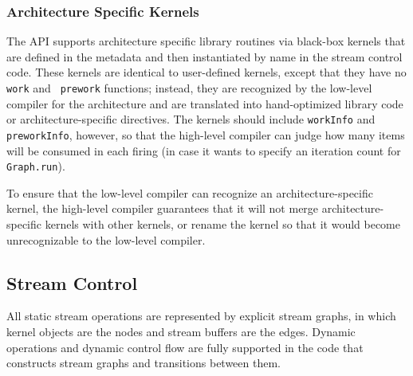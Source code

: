 \subsubsection{Architecture Specific Kernels}
\label{sec:kernelllc}


The API supports architecture specific library routines via black-box
kernels that are defined in the metadata and then instantiated by name
in the stream control code.  These kernels are identical to
user-defined kernels, except that they have no {\tt work} and {\tt
prework} functions; instead, they are recognized by the low-level
compiler for the architecture and are translated into hand-optimized
library code or architecture-specific directives.  The kernels should
include {\tt workInfo} and {\tt preworkInfo}, however, so that the
high-level compiler can judge how many items will be consumed in each
firing (in case it wants to specify an iteration count for {\tt
Graph.run}).

To ensure that the low-level compiler can recognize an
architecture-specific kernel, the high-level compiler guarantees that
it will not merge architecture-specific kernels with other kernels, or
rename the kernel so that it would become unrecognizable to the
low-level compiler.

\subsection{Stream Control}
\label{sec:graphs}

All static stream operations are represented by explicit stream
graphs, in which kernel objects are the nodes and stream buffers are
the edges.  Dynamic operations and dynamic control flow are fully
supported in the code that constructs stream graphs and transitions
between them.

